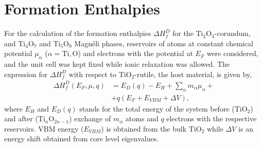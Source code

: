 \section{Formation Enthalpies}
\label{sec:formation}

For the calculation of the formation enthalpies $\Delta H_f^D$ for the Ti$_2$O$_3$-corundum, and Ti$_4$O$_7$ and Ti$_5$O$_9$ Magnéli phases, reservoirs of atoms at constant chemical potential $\mu_{\alpha}$ ($\alpha = \text{Ti}, \text{O}$) and electrons with the potential at $E_F$ were considered, and the unit cell was kept fixed while ionic relaxation was allowed. The expression for $\Delta H_f^D$ with respect to TiO$_2$-rutile, the host material, is given by,
\begin{align}
	\label{eq:e-form-isolated}
	\Delta H_f^D (E_F, \mu, q) &= E_D(q) - E_H + \sum_{\alpha} m_{\alpha} \mu_{\alpha} + \nonumber \\
							   &+ q (E_F + E_{VBM} + \Delta V),
\end{align}
where $E_H$ and $E_D(q)$ stands for the total energy of the system before (TiO$_2$) and after (Ti$_n$O$_{2n-1}$) exchange of $m_{\alpha}$ atoms and $q$ electrons with the respective reservoirs. VBM energy ($E_{VBM}$) is obtained from the bulk TiO$_2$ while $\Delta V$ is an energy shift obtained from core level eigenvalues. 

